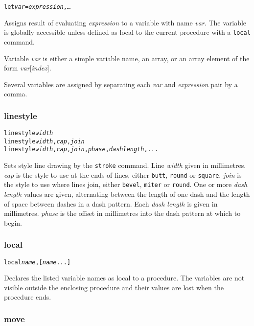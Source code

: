\begin{alltt}
let \textit{var} = \textit{expression}, \dots
\end{alltt}

Assigns result of evaluating \textit{expression} to a variable with name
\textit{var}.  The variable is globally accessible unless defined as local to
the current procedure with a \texttt{local} command.

Variable \textit{var} is either a simple variable name, an array, or an array
element of the form \textit{var}[\textit{index}].

Several variables are assigned by separating each 
\textit{var} and \textit{expression} pair by a comma.

\subsubsection{linestyle}

\begin{alltt}
linestyle \textit{width}
linestyle \textit{width}, \textit{cap}, \textit{join}
linestyle \textit{width}, \textit{cap}, \textit{join}, \textit{phase}, \textit{dash length}, ...
\end{alltt}

Sets style line drawing by the \texttt{stroke}
command.
Line \textit{width} given in millimetres.
\textit{cap} is the style to use at the ends of lines, either
\texttt{butt}, \texttt{round} or \texttt{square}.
\textit{join} is the style to use where lines join, either
\texttt{bevel}, \texttt{miter} or \texttt{round}.
One or more \textit{dash length} values are given, alternating
between the length of one dash and the length of space between
dashes in a dash pattern.  Each \textit{dash length} is given in millimetres.
\textit{phase} is the offset in millimetres into the dash pattern 
at which to begin.

\subsubsection{local}

\begin{alltt}
local \textit{name}, [\textit{name} ...]
\end{alltt}

Declares the listed variable names as local to a procedure.
The variables are not visible outside the enclosing procedure
and their values are lost when the procedure ends.

\subsubsection{move}

